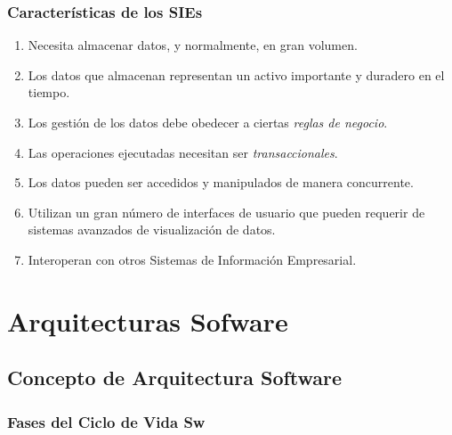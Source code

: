 \documentclass[a4paper,t,xcolor=pst,dvips,colortheme]{beamer}
\begin{document}
\begin{frame}[c]
    \frametitle{Características de los SIEs}
    \begin{enumerate}[<+->]
        \item Necesita almacenar datos, y normalmente, en gran volumen.
        \item Los datos que almacenan representan un activo importante y duradero en el tiempo.
        \item Los gestión de los datos debe obedecer a ciertas \emph{reglas de negocio}.
        \item Las operaciones ejecutadas necesitan ser \emph{transaccionales}.
        \item Los datos pueden ser accedidos y manipulados de manera concurrente.
        \item Utilizan un gran número de interfaces de usuario que pueden requerir de sistemas avanzados de visualización de datos.
        \item Interoperan con otros Sistemas de Información Empresarial.
    \end{enumerate}
\end{frame}

\section[Arquitecturas Sw]{Arquitecturas Sofware}

\subsection{Concepto de Arquitectura Software}

\begin{frame}[t]
   \frametitle{Fases del Ciclo de Vida Sw}
\end{frame}
\end{document}
